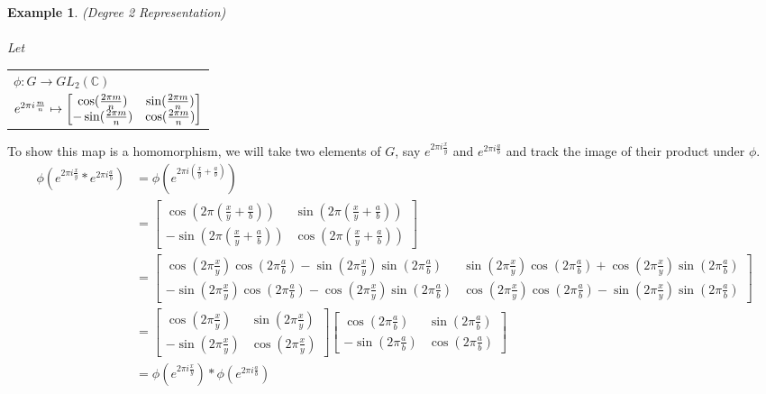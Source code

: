 \documentclass[10pt]{ucthesis}
\newtheorem{example}[definition]{Example}
\begin{document}
\begin{example}
	(Degree 2 Representation) \\\\
	\renewcommand{\arraystretch}{1}
	Let   \begin{tabular}{l}$\phi:G\rightarrow GL_2(\mathbb{C})$\\
		$\hspace{0mm}e^{2\pi i\frac{m}{n}}\mapsto \begin{bmatrix}
							\cos(\frac{2\pi m}{n}) & \sin(\frac{2\pi m}{n}) \\
							-\sin(\frac{2\pi m}{n}) & \cos(\frac{2\pi m}{n})
						      \end{bmatrix}$
		\end{tabular}
\end{example}
\noindent To show this map is a homomorphism, we will take two elements of $G$, say $e^{2\pi i\frac{x}{y}}$ and $e^{2\pi i\frac{a }{b}}$ and track the image of their product under $\phi$. \\
	\begin{equation}
		\begin{aligned}
			\phi(e^{2\pi i\frac{x}{y}} * e^{2\pi i\frac{a}{b}} ) &= \phi(e^{2\pi i(\frac{x}{y}+\frac{a}{b})})\\ 
												    &= \begin{bmatrix}
														\cos(2\pi(\frac{x}{y}+\frac{a}{b})) & \sin(2\pi(\frac{x}{y}+\frac{a}{b})) \\
														-\sin(2\pi(\frac{x}{y}+\frac{a}{b})) & \cos(2\pi(\frac{x}{y}+\frac{a}{b}))
													  \end{bmatrix}\\
												    &= \begin{bmatrix}
														\cos(2\pi\frac{x}{y})\cos(2\pi\frac{a}{b}) - \sin(2\pi\frac{x}{y})\sin(2\pi\frac{a}{b})   &\sin(2\pi\frac{x}{y})\cos(2\pi\frac{a}{b}) + \cos(2\pi\frac{x}{y})\sin(2\pi\frac{a}{b})\\
														-\sin(2\pi\frac{x}{y})\cos(2\pi\frac{a}{b}) - \cos(2\pi\frac{x}{y})\sin(2\pi\frac{a}{b}) & \cos(2\pi\frac{x}{y})\cos(2\pi\frac{a}{b}) - \sin(2\pi\frac{x}{y})\sin(2\pi\frac{a}{b})
													  \end{bmatrix}\\ 
												    &= \begin{bmatrix}
														\cos(2\pi\frac{x}{y}) & \sin(2\pi\frac{x}{y}) \\
														-\sin(2\pi\frac{x}{y}) & \cos(2\pi\frac{x}{y})
												          \end{bmatrix}
											  		  \begin{bmatrix}
														\cos(2\pi\frac{a}{b}) & \sin(2\pi\frac{a}{b}) \\
														-\sin(2\pi\frac{a}{b}) & \cos(2\pi\frac{a}{b})
													  \end{bmatrix} \\
		                                                                                    &= \phi(e^{2\pi i\frac{x}{y}})*\phi(e^{2\pi i\frac{a}{b}})
		\end{aligned}
	\end{equation}
\end{document}
